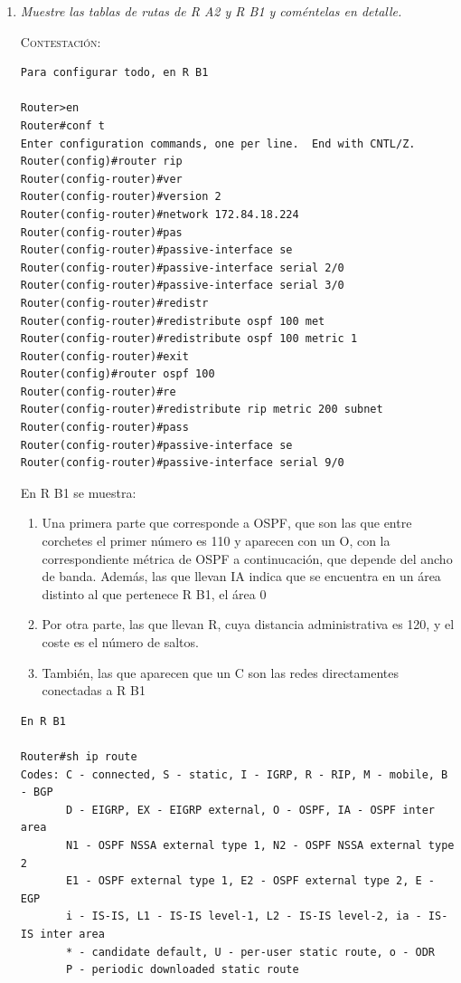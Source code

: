 \documentclass[11pt]{article}
\begin{document}
\begin{enumerate}
    \item \textit{Muestre las tablas de rutas de R A2 y R B1 y coméntelas en detalle.}
    \vspace{7px}

    \textsc{Contestación}: 
    
\begin{mdframed}
\begin{verbatim}
Para configurar todo, en R B1

Router>en
Router#conf t
Enter configuration commands, one per line.  End with CNTL/Z.
Router(config)#router rip
Router(config-router)#ver
Router(config-router)#version 2
Router(config-router)#network 172.84.18.224
Router(config-router)#pas
Router(config-router)#passive-interface se
Router(config-router)#passive-interface serial 2/0
Router(config-router)#passive-interface serial 3/0
Router(config-router)#redistr
Router(config-router)#redistribute ospf 100 met
Router(config-router)#redistribute ospf 100 metric 1
Router(config-router)#exit
Router(config)#router ospf 100
Router(config-router)#re
Router(config-router)#redistribute rip metric 200 subnet
Router(config-router)#pass
Router(config-router)#passive-interface se
Router(config-router)#passive-interface serial 9/0
\end{verbatim}
\end{mdframed}

En R B1 se muestra:
    \begin{enumerate}
        \item Una primera parte que corresponde a OSPF, que son las que entre corchetes el primer número es 110 y aparecen con un O, con la correspondiente métrica de OSPF a continucación, que depende del ancho de banda. Además, las que llevan IA indica que se encuentra en un área distinto al que pertenece R B1, el área 0
        \item Por otra parte, las que llevan R, cuya distancia administrativa es 120, y el coste es el número de saltos.
        \item También, las que aparecen que un C son las redes directamentes conectadas a R B1
    \end{enumerate}

\begin{mdframed}
\begin{verbatim}
En R B1

Router#sh ip route 
Codes: C - connected, S - static, I - IGRP, R - RIP, M - mobile, B - BGP
       D - EIGRP, EX - EIGRP external, O - OSPF, IA - OSPF inter area
       N1 - OSPF NSSA external type 1, N2 - OSPF NSSA external type 2
       E1 - OSPF external type 1, E2 - OSPF external type 2, E - EGP
       i - IS-IS, L1 - IS-IS level-1, L2 - IS-IS level-2, ia - IS-IS inter area
       * - candidate default, U - per-user static route, o - ODR
       P - periodic downloaded static route


\end{verbatim}
\end{mdframed}
\end{enumerate}
\end{document}
